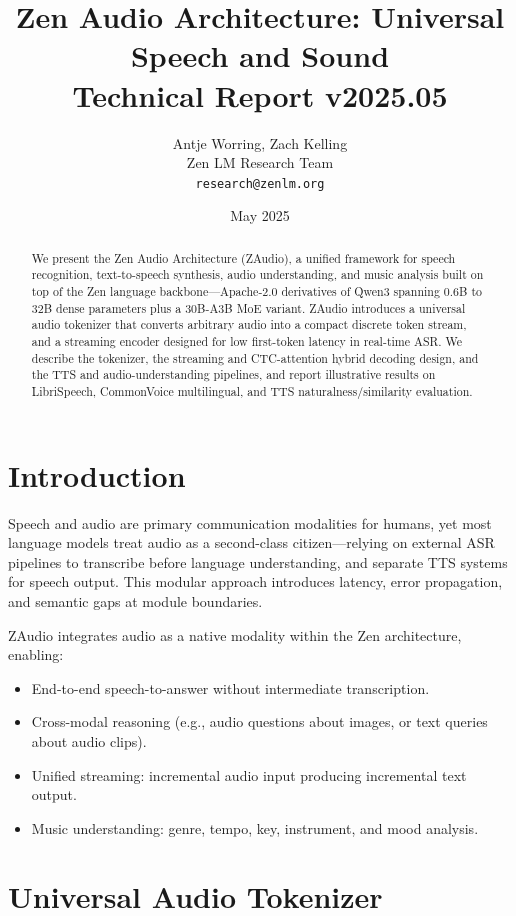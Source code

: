 \documentclass[11pt,a4paper]{article}
\title{\textbf{Zen Audio Architecture: Universal Speech and Sound}\\
\large Technical Report v2025.05}
\author{Antje Worring, Zach Kelling \\ Zen LM Research Team\\
\texttt{research@zenlm.org}}
\date{May 2025}
\begin{document}
\maketitle

\begin{abstract}
We present the Zen Audio Architecture (ZAudio), a unified framework for speech recognition, text-to-speech synthesis, audio understanding, and music analysis built on top of the Zen language backbone---Apache-2.0 derivatives of Qwen3 spanning 0.6B to 32B dense parameters plus a 30B-A3B MoE variant. ZAudio introduces a universal audio tokenizer that converts arbitrary audio into a compact discrete token stream, and a streaming encoder designed for low first-token latency in real-time ASR. We describe the tokenizer, the streaming and CTC-attention hybrid decoding design, and the TTS and audio-understanding pipelines, and report illustrative results on LibriSpeech, CommonVoice multilingual, and TTS naturalness/similarity evaluation.
\end{abstract}

\section{Introduction}

Speech and audio are primary communication modalities for humans, yet most language models treat audio as a second-class citizen—relying on external ASR pipelines to transcribe before language understanding, and separate TTS systems for speech output. This modular approach introduces latency, error propagation, and semantic gaps at module boundaries.

ZAudio integrates audio as a native modality within the Zen architecture, enabling:
\begin{itemize}
  \item End-to-end speech-to-answer without intermediate transcription.
  \item Cross-modal reasoning (e.g., audio questions about images, or text queries about audio clips).
  \item Unified streaming: incremental audio input producing incremental text output.
  \item Music understanding: genre, tempo, key, instrument, and mood analysis.
\end{itemize}

\section{Universal Audio Tokenizer}
\end{document}
